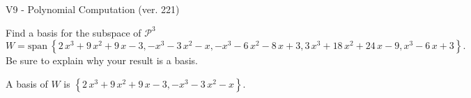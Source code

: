 \begin{exercise}
  \begin{exerciseTitle}V9 - Polynomial Computation (ver. 221)\end{exerciseTitle}
  \begin{exerciseStatement}
    Find a basis for the subspace of \(\mathcal{P}^3\) 
\[W=\mathrm{span}\ \left\{2 \, x^{3} + 9 \, x^{2} + 9 \, x - 3 , -x^{3} - 3 \, x^{2} - x , -x^{3} - 6 \, x^{2} - 8 \, x + 3 , 3 \, x^{3} + 18 \, x^{2} + 24 \, x - 9 , x^{3} - 6 \, x + 3\right\}.\]
 Be sure to explain why your result is a basis.


  \end{exerciseStatement}
  \begin{exerciseAnswer}
   A basis of \(W\) is  \(\left\{2 \, x^{3} + 9 \, x^{2} + 9 \, x - 3 , -x^{3} - 3 \, x^{2} - x\right\}\).
  


  \end{exerciseAnswer}
\end{exercise}